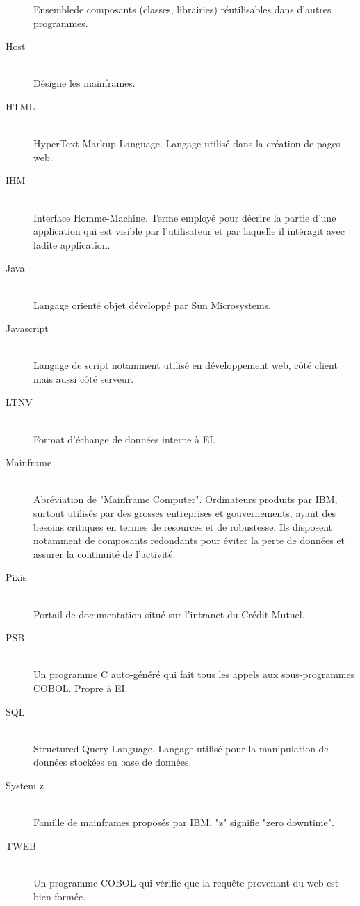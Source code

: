 \documentclass[a4paper,french,12pt]{article}
\begin{document}
\begin{description}
				Ensemblede composants (classes, librairies) réutilisables dans d'autres programmes.
			\item[Host]  \hfill \\
				Désigne les mainframes.
			\item[HTML] \hfill \\
				HyperText Markup Language. Langage utilisé dans la création de pages web.
			\item[IHM] \hfill \\
				Interface Homme-Machine. Terme employé pour décrire la partie d'une application qui est visible par l'utilisateur et par laquelle il intéragit avec ladite application.
			\item[Java] \hfill \\
				Langage orienté objet développé par Sun Microsystems.
			\item[Javascript] \hfill \\
				Langage de script notamment utilisé en développement web, côté client mais aussi côté serveur.
			\item[LTNV] \hfill \\
				Format d'échange de données interne à EI.
			\item[Mainframe] \hfill \\
				Abréviation de "Mainframe Computer". Ordinateurs produits par IBM, surtout utilisés par des grosses entreprises et gouvernements,
				ayant des besoins critiques en termes de resources et de robustesse. Ils disposent notamment de composants redondants pour éviter la perte de données et assurer la continuité de l'activité.
			\item[Pixis] \hfill \\
				Portail de documentation situé sur l'intranet du Crédit Mutuel.
			\item[PSB] \hfill \\
				 Un programme C auto-généré qui fait tous les appels aux sous-programmes COBOL. Propre à EI.
			\item[SQL] \hfill \\
				Structured Query Language. Langage utilisé pour la manipulation de données stockées en base de données.
			\item[System z] \hfill \\
				Famille de mainframes proposés par IBM. "z" signifie "zero downtime".
			\item[TWEB] \hfill \\
				Un programme COBOL qui vérifie que la requête provenant du web est bien formée.

\end{description}
\end{document}
